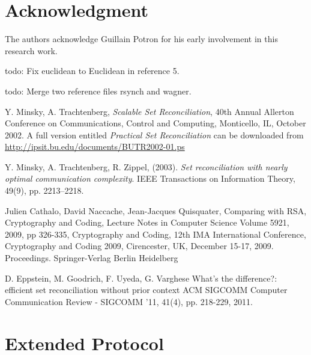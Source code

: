\documentclass[11pt]{llncs}
\begin{document}
\section{Acknowledgment}

The authors acknowledge Guillain Potron for his early involvement in this research work.\smallskip

todo: Fix euclidean to Euclidean in reference 5.\smallskip

todo: Merge two reference files rsynch and wagner.\smallskip
\nocite{rsync}
\nocite{wagner}




\begin{thebibliography}{30}

 Y. Minsky, A. Trachtenberg, {\sl Scalable Set Reconciliation}, 40th Annual Allerton Conference on Communications, Control and Computing, Monticello, IL, October 2002. A full version entitled {\sl Practical Set Reconciliation} can be downloaded from \url{http://ipsit.bu.edu/documents/BUTR2002-01.ps}

 Y. Minsky, A. Trachtenberg, R. Zippel, (2003). {\sl Set reconciliation with nearly optimal communication complexity}. IEEE Transactions on Information Theory, 49(9), pp. 2213–2218.

 Julien Cathalo, David Naccache, Jean-Jacques Quisquater, Comparing with RSA, Cryptography and Coding, Lecture Notes in Computer Science Volume 5921, 2009, pp 326-335, Cryptography and Coding, 12th IMA International Conference, Cryptography and Coding 2009, Cirencester, UK, December 15-17, 2009. Proceedings. Springer-Verlag Berlin Heidelberg
    
 D. Eppstein, M. Goodrich, F. Uyeda, G. Varghese What's the difference?: efficient set reconciliation without prior context
ACM SIGCOMM Computer Communication Review - SIGCOMM '11, 41(4), pp. 218-229, 2011.


\end{thebibliography}

\appendix

\section{Extended Protocol}
\end{document}
